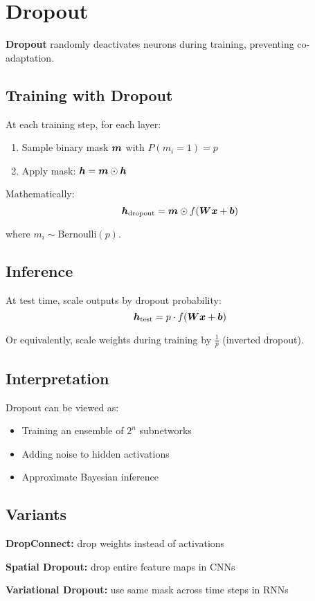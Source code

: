 
\section{Dropout}
\label{sec:dropout}

\textbf{Dropout} randomly deactivates neurons during training, preventing co-adaptation.

\subsection{Training with Dropout}

At each training step, for each layer:
\begin{enumerate}
    \item Sample binary mask $\boldsymbol{m}$ with $P(m_i = 1) = p$
    \item Apply mask: $\boldsymbol{h} = \boldsymbol{m} \odot \boldsymbol{h}$
\end{enumerate}

Mathematically:
\begin{equation}
\boldsymbol{h}_{\text{dropout}} = \boldsymbol{m} \odot f(\boldsymbol{W}\boldsymbol{x} + \boldsymbol{b})
\end{equation}

where $m_i \sim \text{Bernoulli}(p)$.

\subsection{Inference}

At test time, scale outputs by dropout probability:
\begin{equation}
\boldsymbol{h}_{\text{test}} = p \cdot f(\boldsymbol{W}\boldsymbol{x} + \boldsymbol{b})
\end{equation}

Or equivalently, scale weights during training by $\frac{1}{p}$ (inverted dropout).

\subsection{Interpretation}

Dropout can be viewed as:
\begin{itemize}
    \item Training an ensemble of $2^n$ subnetworks
    \item Adding noise to hidden activations
    \item Approximate Bayesian inference
\end{itemize}

\subsection{Variants}

\textbf{DropConnect:} drop weights instead of activations

\textbf{Spatial Dropout:} drop entire feature maps in CNNs

\textbf{Variational Dropout:} use same mask across time steps in RNNs

